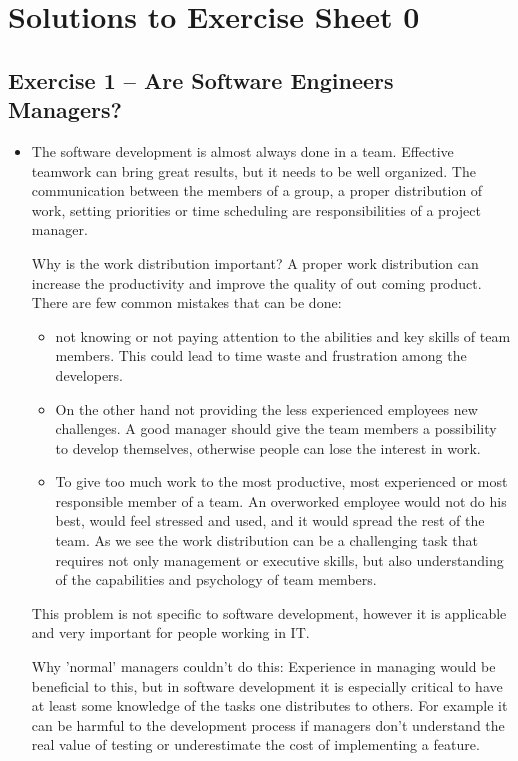 \documentclass{scrartcl}
\begin{document}
\section*{Solutions to Exercise Sheet 0}

\subsection*{Exercise 1 – Are Software Engineers Managers?}
\begin{itemize}
\item The software development is almost always done in a team. 
Effective teamwork can bring great results, but it needs to be well organized. 
The communication between the members of a group, a proper distribution of work, 
setting priorities or time scheduling are responsibilities of a project manager. 

Why is the work distribution important?
A proper work distribution can increase the productivity and improve the quality of out coming product. 
There are few common mistakes that can be done:
\begin{itemize}
\item not knowing or not paying attention to the abilities and key skills of team members. 
This could lead to time waste and frustration among the developers.
\item On the other hand not providing the less experienced employees new challenges. 
A good manager should give the team members a possibility to develop themselves, 
otherwise people can lose the interest in work.
\item To give too much work to the most productive, most experienced or most responsible member of a team. 
An overworked employee would not do his best, would feel stressed and used, and it would spread the rest of the team.
As we see the work distribution can be a challenging task that requires not only management or executive skills, 
but also understanding of the capabilities and psychology of team members. 
\end{itemize}
This problem is not specific to software development, 
however it is applicable and very important for people working in IT.

Why 'normal' managers couldn't do this:
Experience in managing would be beneficial to this, but in software development it is especially critical
to have at least some knowledge of the tasks one distributes to others. For example it can be harmful to
the development process if managers don't understand the real value of testing or underestimate the cost
of implementing a feature.


\end{itemize}
\end{document}
